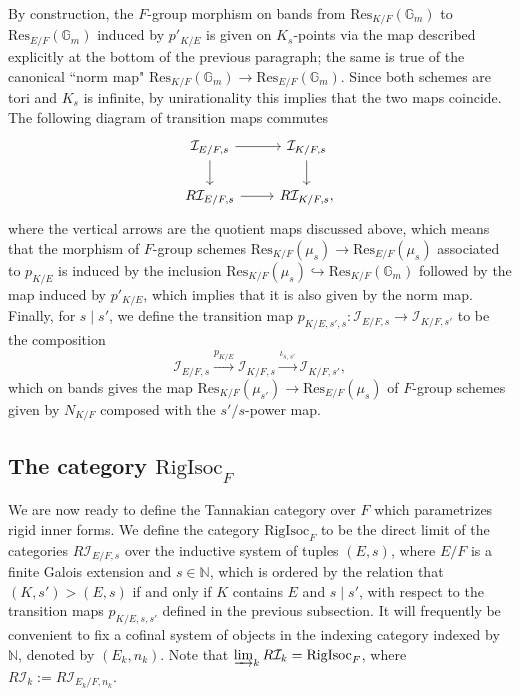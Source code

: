 \documentclass[11pt]{amsart}
\theoremstyle{definition}
\newcommand{\mc}{\mathcal}
\newcommand{\RigIsoc}{\mathrm{RigIsoc}}
\begin{document}
By construction, the $F$-group morphism on bands from $\text{Res}_{K/F}(\mathbb{G}_{m})$ to $\text{Res}_{E/F}(\mathbb{G}_{m})$ induced by $p'_{K/E}$ is given on $K_{s}$-points via the map described explicitly at the bottom of the previous paragraph; the same is true of the canonical ``norm map" $\text{Res}_{K/F}(\mathbb{G}_{m}) \to \text{Res}_{E/F}(\mathbb{G}_{m})$. Since both schemes are tori and $K_{s}$ is infinite, by unirationality this implies that the two maps coincide. The following diagram of transition maps commutes
\[
\begin{tikzcd}
\mc{I}_{E/F,s} \arrow{d} \arrow{r} & \mc{I}_{K/F,s} \arrow{d} \\
R\mc{I}_{E/F,s} \arrow{r} & R \mc{I}_{K/F,s},
\end{tikzcd}
\]
where the vertical arrows are the quotient maps discussed above, which means that the morphism of $F$-group schemes $\text{Res}_{K/F}(\mu_{s}) \to \text{Res}_{E/F}(\mu_{s})$ associated to $p_{K/E}$ is induced by the inclusion $\text{Res}_{K/F}(\mu_{s}) \hookrightarrow \text{Res}_{K/F}(\mathbb{G}_{m})$ followed by the map induced by $p'_{K/E}$, which implies that it is also given by the norm map. Finally, for $s \mid s'$, we define the transition map $p_{K/E,s',s} \colon \mc{I}_{E/F,s} \to \mc{I}_{K/F,s'}$ to be the composition 
$$\mc{I}_{E/F,s} \xrightarrow{p_{K/E}} \mc{I}_{K/F,s} \xrightarrow{\iota_{s,s'}} \mc{I}_{K/F,s'},$$ which on bands gives the map $\text{Res}_{K/F}(\mu_{s'}) \to \text{Res}_{E/F}(\mu_{s})$ of $F$-group schemes given by $N_{K/F}$ composed with the $s'/s$-power map.

\subsection{The category $\RigIsoc_{F}$}\label{sec:RigIsocdef}
We are now ready to define the Tannakian category over $F$ which parametrizes rigid inner forms. We define the category $\RigIsoc_{F}$ to be the direct limit of the categories $R\mc{I}_{E/F,s}$ over the inductive system of tuples $(E, s)$, where $E/F$ is a finite Galois extension and $s \in \mathbb{N}$, which is ordered by the relation that $(K,s') > (E,s)$ if and only if $K$ contains $E$ and $s \mid s'$, with respect to the transition maps $p_{K/E,s,s'}$ defined in the previous subsection. It will frequently be convenient to fix a cofinal system of objects in the indexing category indexed by $\mathbb{N}$, denoted by $(E_{k}, n_{k})$. Note that $\varinjlim_{k} R\mc{I}_{k} = \RigIsoc_{F}$, where $R\mc{I}_{k} := R\mc{I}_{E_{k}/F,n_{k}}$.
\end{document}
